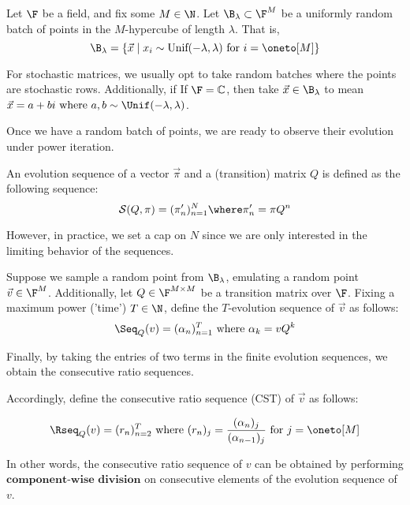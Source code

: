 \begin{definition}
Let $\F$ be a field, and fix some $M \in \N$. Let $\B_\lambda \subset \F^M$ be a uniformly random batch of points in the $M$-hypercube of length $\lambda$. That is,
$$\B_\lambda = \{\vec{x} \mid x_i \sim \text{Unif}(-\lambda, \lambda) \text{ for } i = \oneto[M]\}$$
\end{definition}

For stochastic matrices, we usually opt to take random batches where the points are stochastic rows.
Additionally, if If $\F = \mathbb{C}$, then take $\vec{x} \in \B_\lambda$ to mean $\vec{x} = a + bi \text{ where } a,b \sim \Unif(-\lambda,\lambda)$.

\newpage

Once we have a random batch of points, we are ready to observe their evolution under power iteration.

\begin{definition}
An evolution sequence of a vector $\vec{\pi}$ and a (transition) matrix $Q$ is defined as the following sequence:
$$\mathcal{S}(Q,\pi) = ( \pi'_n )_{n=1}^N \where  \pi'_n  = \pi Q^n$$
\end{definition}

However, in practice, we set a cap on $N$ since we are only interested in the limiting behavior of the sequences.

\begin{definition}
Suppose we sample a random point from $\B_\lambda$, emulating a random point $\vec{v} \in \F^M$.
Additionally, let $Q \in \F^{M \times M}$ be a transition matrix over $\F$.
Fixing a maximum power ('time') $T \in \N$, define the $T$-evolution sequence of $\vec{v}$ as follows:
$$\Seq_Q(v) = (\alpha_n)_{n=1}^T \text{ where } \alpha_k = {v}Q^k$$
\end{definition}

Finally, by taking the entries of two terms in the finite evolution sequences, we obtain the consecutive ratio sequences.

\begin{definition}

Accordingly, define the consecutive ratio sequence (CST) of $\vec{v}$ as follows:

$$\Rseq_Q(v) = (r_n)_{n=2}^T \text{ where } (r_n)_j = \frac{(\alpha_n)_j}{(\alpha_{n-1})_j} \text{ for } j = \oneto[M]$$

In other words, the consecutive ratio sequence of $v$ can be obtained by performing $\textbf{component-wise division}$ on consecutive elements of the evolution sequence of $v$.
\end{definition}

